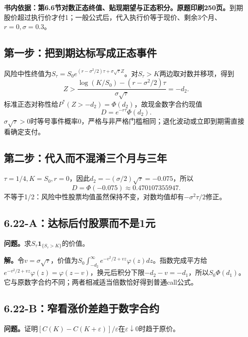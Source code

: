 \documentclass[11pt,a4paper,UTF8,fontset=fandol]{ctexart}
\begin{document}
\textbf{书内依据：第6.6节对数正态终值、贴现期望与正态积分。原题印刷250页。}到期股价超过执行价才付1；一般公式后，代入执行价等于现价、剩余3个月、\(r=0,\sigma=0.3\)。

\subsection{第一步：把到期达标写成正态事件}\label{ux7b2cux4e00ux6b65ux628aux5230ux671fux8fbeux6807ux5199ux6210ux6b63ux6001ux4e8bux4ef6}

风险中性终值为\(S_\tau=S_0e^{(r-\sigma^2/2)\tau+\sigma\sqrt\tau Z}\)。对\(S_\tau>K\)两边取对数并移项，得到
\[Z>\frac{\log(K/S_0)-(r-\sigma^2/2)\tau}{\sigma\sqrt\tau}=-d_2.\]
标准正态对称性给\(P^*(Z>-d_2)=\Phi(d_2)\)，故现金数字合约现值
\[\boxed{D=e^{-r\tau}\Phi(d_2).}\]
\(\sigma\sqrt\tau>0\)时等号事件概率0，严格与非严格门槛相同；退化波动或立即到期需直接看确定支付。

\subsection{第二步：代入而不混淆三个月与三年}\label{ux7b2cux4e8cux6b65ux4ee3ux5165ux800cux4e0dux6df7ux6dc6ux4e09ux4e2aux6708ux4e0eux4e09ux5e74}

\(\tau=1/4,K=S_0,r=0\)，因此\(d_2=-(\sigma/2)\sqrt\tau=-0.075\)，所以
\[\boxed{D=\Phi(-0.075)\approx0.470107355947.}\]
不等于1/2：风险中性股票均值虽然保持不变，对数均值却有\(-\sigma^2\tau/2\)修正。

\subsection{6.22-A：达标后付股票而不是1元}\label{aux8fbeux6807ux540eux4ed8ux80a1ux7968ux800cux4e0dux662f1ux5143}

\textbf{问题。}求\(S_\tau\mathbf1_{\{S_\tau>K\}}\)的价值。

\textbf{解。}令\(v=\sigma\sqrt\tau\)，价值为\(S_0\int_{-d_2}^{\infty}e^{-v^2/2+vz}\varphi(z)dz\)。指数完成平方给\(e^{-v^2/2+vz}\varphi(z)=\varphi(z-v)\)，换元后积分下限\(-d_2-v=-d_1\)，所以\(\boxed{S_0\Phi(d_1)}\)。它与原数字合约不同；两者相减适当倍数恰好得到普通call公式。

\subsection{6.22-B：窄看涨价差趋于数字合约}\label{bux7a84ux770bux6da8ux4ef7ux5deeux8d8bux4e8eux6570ux5b57ux5408ux7ea6}

\textbf{问题。}证明\([C(K)-C(K+\varepsilon)]/\varepsilon\)在\(\varepsilon\downarrow0\)时趋于原价。
\end{document}
